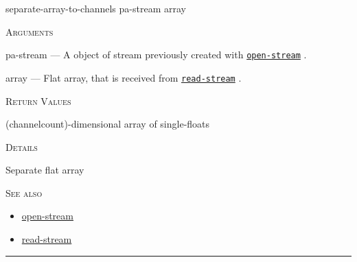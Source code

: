 \documentclass[a4paper]{report}
\begin{document}
    \label{portaudio__fun__separate-array-to-channels}
    \begin{defun}[Function]
    separate-array-to-channels pa-stream array


    
    \bigskip
    \textsc{Arguments}

pa-stream
	--- A object of stream previously created with \hyperref[portaudio__fun__open-stream]{\texttt{open-stream}}
  .

array
	--- Flat array, that is received from \hyperref[portaudio__fun__read-stream]{\texttt{read-stream}}
  .




    
    \bigskip
    \textsc{Return Values}


 (channelcount)-dimensional array of single-floats


	
    \bigskip
    \textsc{Details}

Separate flat array






      
    \bigskip
    \textsc{See also}


	
    \begin{itemize}
    
	  
    \item
    \hyperref[portaudio__fun__open-stream]{open-stream}
    
    \item
    \hyperref[portaudio__fun__read-stream]{read-stream}
    
	
    \end{itemize}
  
      


    
    \end{defun}
  
  

    \rule{\linewidth}{0.1mm}
    
\end{document}
